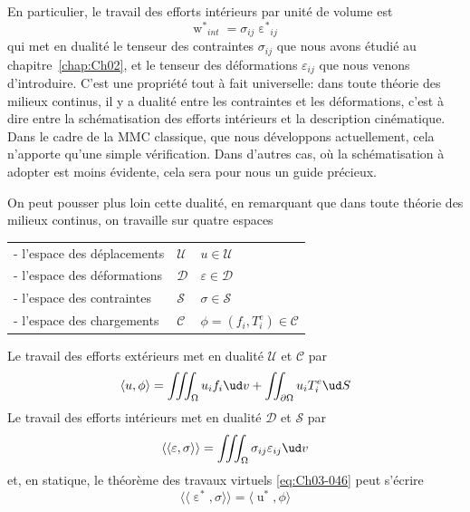 En particulier, le travail des efforts intérieurs par unité de volume est
\begin{equation}
    {\mathop{w}^*}_{int} = \sigma_{ij} {\mathop{\varepsilon}^*}_{ij}
    \label{eq:Ch03-047}
\end{equation}
qui met en dualité le tenseur des contraintes $\sigma_{ij}$ que nous avons étudié au chapitre~\ref{chap:Ch02}, et le tenseur des déformations $\varepsilon_{ij}$ que nous venons d'introduire.
C'est une propriété tout à fait universelle: dans toute théorie des milieux continus, il y a dualité entre les contraintes et les déformations, c'est à dire entre la schématisation des efforts intérieurs et la description cinématique.
Dans le cadre de la MMC classique, que nous développons actuellement, cela n'apporte qu'une simple vérification.
Dans d'autres cas, où la schématisation à adopter est moins évidente, cela sera pour nous un guide précieux.

On peut pousser plus loin cette dualité, en remarquant que dans toute théorie des milieux continus, on travaille sur quatre espaces\\
\begin{tabular}{lll}
    - l'espace des déplacements &$\mathcal{U} $&$ u \in \mathcal{U}$ \\
    - l'espace des déformations &$\mathcal{D} $&$ \varepsilon \in \mathcal{D}$ \\
    - l'espace des contraintes  &$\mathcal{S} $&$ \sigma \in \mathcal{S}$ \\
    - l'espace des chargements  &$\mathcal{C} $&$ \phi = \left( f_i, T_i^e \right) \in \mathcal{C}$ \\
\end{tabular}

Le travail des efforts extérieurs met en dualité $\mathcal{U}$ et $\mathcal{C}$ par
\begin{equation}
    \langle u, \phi \rangle = \iiint_{\Omega} u_i f_i \ud v + \iint_{\partial \Omega} u_{i} T_i^e \ud S
    \label{eq:Ch03-048}
\end{equation}
Le travail des efforts intérieurs met en dualité $\mathcal{D}$ et $\mathcal{S}$ par
\begin{equation}
    \langle\langle \varepsilon, \sigma \rangle\rangle = \iiint_{\Omega} \sigma_{ij} \varepsilon_{ij} \ud v
    \label{eq:Ch03-049}
\end{equation}
et, en statique, le théorème des travaux virtuels \eqref{eq:Ch03-046} peut s'écrire
\begin{equation}
    \langle\langle \mathop{\varepsilon}^* , \sigma \rangle \rangle = \langle \mathop{u}^* , \phi \rangle
    \label{eq:Ch03-050}
\end{equation}

